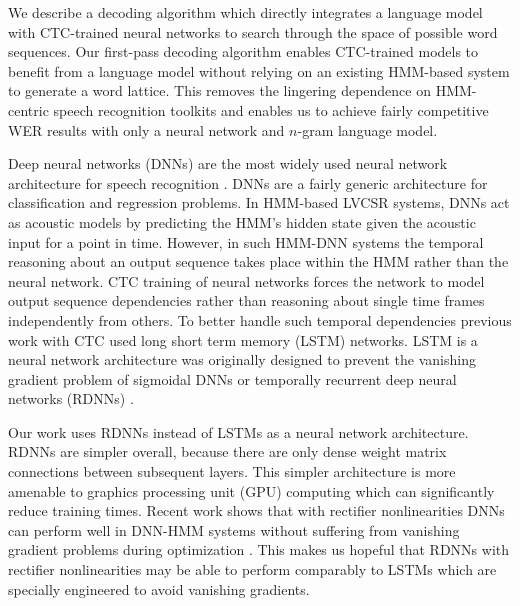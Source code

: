 We describe a decoding algorithm which directly integrates a language model
with CTC-trained neural networks to search through the space of possible word
sequences. Our first-pass decoding algorithm enables CTC-trained models to
benefit from a language model without relying on an existing HMM-based system
to generate a word lattice. This removes the lingering dependence on
HMM-centric speech recognition toolkits and enables us to achieve fairly
competitive WER results with only a neural network and $n$-gram language model.

Deep neural networks (DNNs) are the most widely used neural network
architecture for speech recognition \cite{hinton2012}. DNNs are a fairly
generic architecture for classification and regression problems. In HMM-based
LVCSR systems, DNNs act as acoustic models by predicting the HMM's hidden state
given the acoustic input for a point in time. However, in such HMM-DNN systems
the temporal reasoning about an output sequence takes place within the HMM
rather than the neural network. CTC training of neural networks forces the
network to model output sequence dependencies rather than reasoning about
single time frames independently from others. To better handle such temporal
dependencies previous work with CTC used long short term memory (LSTM)
networks. LSTM is a neural network architecture was originally designed to
prevent the vanishing gradient problem of sigmoidal DNNs or temporally
recurrent deep neural networks (RDNNs) \cite{hochreiter1997}.

Our work uses RDNNs instead of LSTMs as a neural network architecture. RDNNs
are simpler overall, because there are only dense weight matrix connections
between subsequent layers. This simpler architecture is more amenable to
graphics processing unit (GPU) computing which can significantly reduce
training times. Recent work shows that with rectifier nonlinearities DNNs can
perform well in DNN-HMM systems without suffering from vanishing gradient
problems during optimization \cite{dahl2013, zeiler2013, maas2013}. This makes
us hopeful that RDNNs with rectifier nonlinearities may be able to perform
comparably to LSTMs which are specially engineered to avoid vanishing
gradients.
